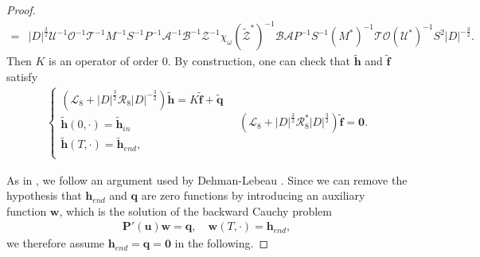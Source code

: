 \documentclass[12pt]{amsart}
\theoremstyle{remark}
\theoremstyle{definition}
\numberwithin{equation}{section}
\newcommand{\f}{\frac}
\newcommand{\mA}{\mathcal{A}}
\newcommand{\mB}{\mathcal{B}}
\newcommand{\mL}{\mathcal{L}}
\newcommand{\mR}{\mathcal{R}}
\newcommand{\mU}{\mathcal{U}}
\newcommand{\mZ}{\mathcal{Z}}
\begin{document}
\begin{proof}
\begin{align*}
=&|D|^{\f32}\mU^{-1}\mathcal{O}^{-1}\mathcal{T}^{-1}M^{-1}S^{-1}P^{-1}\mA^{-1}\mB^{-1}\mZ^{-1}\chi_{\omega}(\tilde{\mZ}^*)^{-1}\mB\mA P^{-1}S^{-1}(M^*)^{-1}\mathcal{T}\mathcal{O}(\mathcal{U}^*)^{-1}S^2|D|^{-\f32}.
\end{align*}
Then $K$ is an operator of order $0$.
By construction, one can check that $\widetilde{\mathbf{h}}$ and $\widetilde{\mathbf{f}}$ satisfy
\begin{align*}
\begin{cases}
(\mL_8 + |D|^{\f32}\mR_8|D|^{-\f32})\widetilde{\mathbf{h}}=K\widetilde{\mathbf{f}}+\widetilde{\mathbf{q}}\\
\widetilde{\mathbf{h}}(0,\cdot)=\widetilde{\mathbf{h}}_{in}\\
\widetilde{\mathbf{h}}(T,\cdot)=\widetilde{\mathbf{h}}_{end},\\
\end{cases}
\quad
(\mL_8 + |D|^{\f32}\mR^*_8|D|^{\f32})\widetilde{\mathbf{f}}= \mathbf{0}.
\end{align*}


As in \cite{BHM}, we follow an argument used by Dehman-Lebeau  \cite{MR2486082}. Since we can remove the hypothesis that $\mathbf{h}_{end}$ and $\mathbf{q}$ are zero functions by introducing an auxiliary function $\mathbf{w}$, which is the solution of the backward Cauchy problem
\begin{align} \label{Puwq}
\mathbf{P}'(\mathbf{u}) \mathbf{w} = \mathbf{q}, \quad  \mathbf{w}(T,\cdot)=\mathbf{h}_{end},
\end{align}
we therefore assume $\mathbf{h}_{end}=\mathbf{q}= \mathbf{0}$ in the following.


\end{proof}
\end{document}
